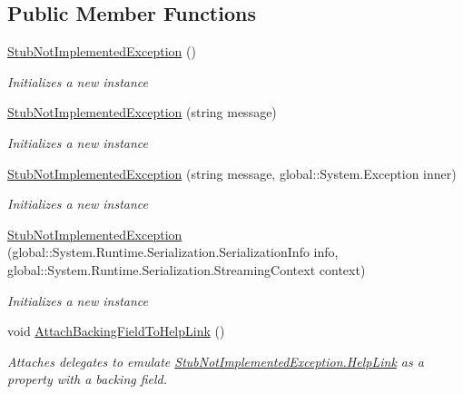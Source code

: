 \subsection*{Public Member Functions}
\begin{DoxyCompactItemize}
\item 
\hyperlink{class_system_1_1_fakes_1_1_stub_not_implemented_exception_ad26f90249f81f41239c8889747aad771}{Stub\-Not\-Implemented\-Exception} ()
\begin{DoxyCompactList}\small\item\em Initializes a new instance\end{DoxyCompactList}\item 
\hyperlink{class_system_1_1_fakes_1_1_stub_not_implemented_exception_a969f8f0045361c3cecb035fd58a0c9d9}{Stub\-Not\-Implemented\-Exception} (string message)
\begin{DoxyCompactList}\small\item\em Initializes a new instance\end{DoxyCompactList}\item 
\hyperlink{class_system_1_1_fakes_1_1_stub_not_implemented_exception_aa6b347bd676d5f047693bec9131b1d34}{Stub\-Not\-Implemented\-Exception} (string message, global\-::\-System.\-Exception inner)
\begin{DoxyCompactList}\small\item\em Initializes a new instance\end{DoxyCompactList}\item 
\hyperlink{class_system_1_1_fakes_1_1_stub_not_implemented_exception_a8234a41f47a21997fc4b2833c8ea68f1}{Stub\-Not\-Implemented\-Exception} (global\-::\-System.\-Runtime.\-Serialization.\-Serialization\-Info info, global\-::\-System.\-Runtime.\-Serialization.\-Streaming\-Context context)
\begin{DoxyCompactList}\small\item\em Initializes a new instance\end{DoxyCompactList}\item 
void \hyperlink{class_system_1_1_fakes_1_1_stub_not_implemented_exception_a42c2cd0a3549e621eb7466596db92af0}{Attach\-Backing\-Field\-To\-Help\-Link} ()
\begin{DoxyCompactList}\small\item\em Attaches delegates to emulate \hyperlink{class_system_1_1_fakes_1_1_stub_not_implemented_exception_a764741cd612b4bb1ce21de5fef3193d0}{Stub\-Not\-Implemented\-Exception.\-Help\-Link} as a property with a backing field.\end{DoxyCompactList}\item 

\end{DoxyCompactItemize}
